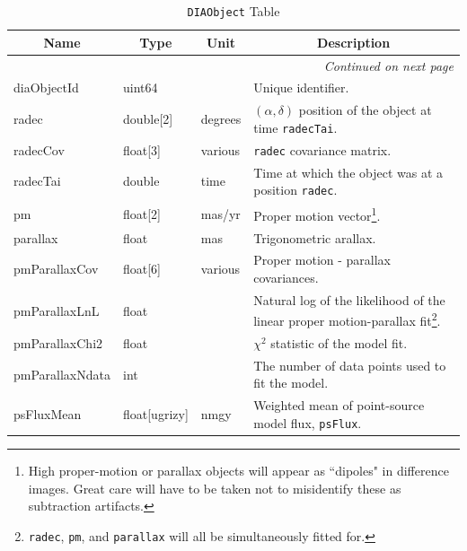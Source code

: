 \documentclass[12pt]{article}
\newcommand{\code}[1]{\texttt{#1}}
\newcommand{\DIAObject}{\code{DIAObject}\xspace}
\begin{document}
\begin{center}
\begin{longtable}{p{3cm}p{2cm}p{2cm}p{5cm}}
\caption[\DIAObject Table]{\DIAObject Table} \\

\hline \multicolumn{1}{c}{\bf Name} & \multicolumn{1}{c}{\bf Type} & \multicolumn{1}{c}{\bf Unit} & \multicolumn{1}{c}{\bf Description} \\ \hline
\endhead

\hline \multicolumn{4}{r}{{\em Continued on next page}} \\
\endfoot

\hline\hline
\endlastfoot

diaObjectId & uint64 & ~ & Unique identifier. \\

radec & double[2] & degrees & $(\alpha, \delta)$ position of the object at time \texttt{radecTai}. \\

radecCov & float[3] & various & \texttt{radec} covariance matrix. \\

radecTai & double & time & Time at which the object was at a position \texttt{radec}. \\

pm & float[2] & mas/yr & Proper motion vector\footnote{High proper-motion or parallax objects will appear as ``dipoles" in difference images. Great care will have to be taken not to misidentify these as subtraction artifacts.}. \\

parallax & float & mas & Trigonometric arallax. \\

pmParallaxCov & float[6] & various & Proper motion - parallax covariances. \\

pmParallaxLnL & float & ~ & Natural log of the likelihood of the linear proper motion-parallax fit\footnote{{\tt radec}, {\tt pm}, and {\tt parallax} will all be simultaneously fitted for.}. \\

pmParallaxChi2 & float & ~ & $\chi^2$ statistic of the model fit. \\

pmParallaxNdata & int & ~ & The number of data points used to fit the model. \\

psFluxMean & float[ugrizy] & nmgy & Weighted mean of point-source model flux, {\tt psFlux}. \\


\end{longtable}
\end{center}
\end{document}
